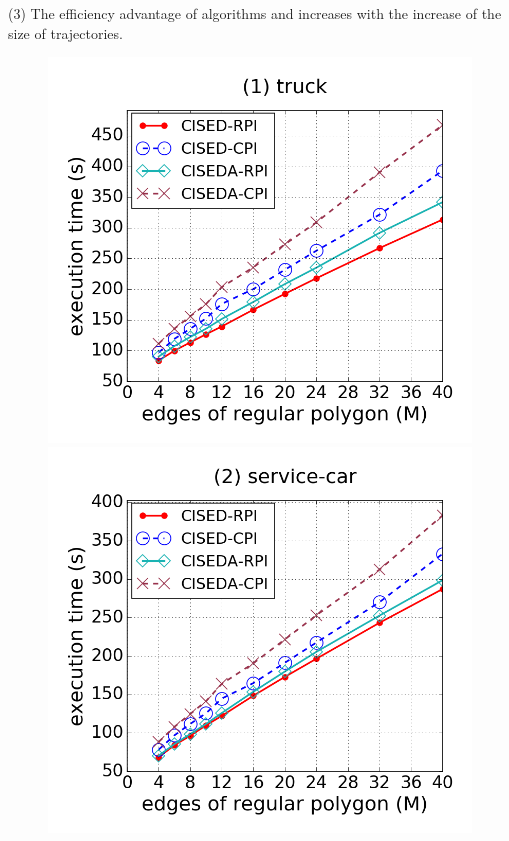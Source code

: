 \ni(3) The efficiency advantage of algorithms \cist and \cista increases with the increase of the size of trajectories.



\begin{figure}[tb!]
\centering
\includegraphics[scale = 0.250]{figures/Exp-M-e-60-time-truck.png}
\includegraphics[scale = 0.250]{figures/Exp-M-e-60-time-service.png}

\end{figure}
